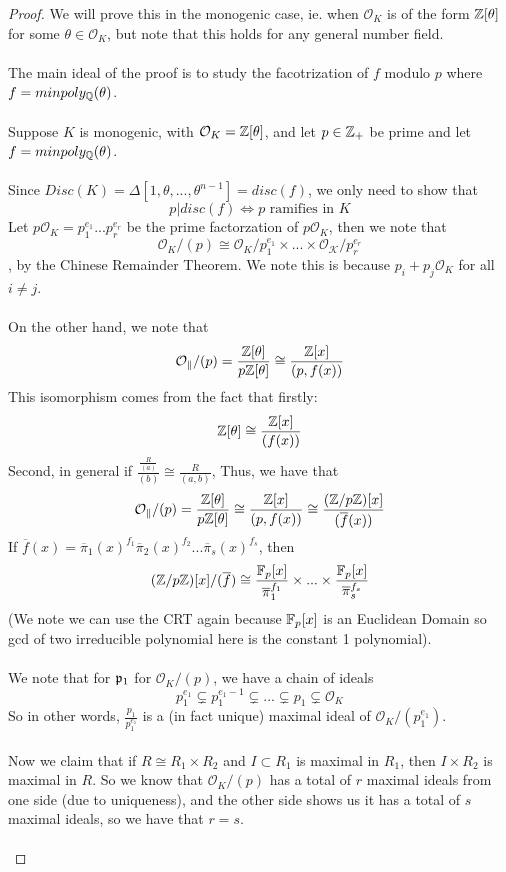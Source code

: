 \begin{proof}
We will prove this in the monogenic case, ie. when $\mathcal{O}_K$ is of the form $\mathbb{Z}[\theta]$ for some $\theta \in \mathcal{O}_K$, but note that this holds for any general number field.\\\\
The main ideal of the proof is to study the facotrization of $f$ modulo $p$ where $f = minpoly_{\mathbb{Q}}(\theta)$.\\\\
Suppose $K$ is monogenic, with $\mathcal{O}_K = \mathbb{Z}[\theta]$, and let $p \in \mathbb{Z}_+$ be prime and let $f = minpoly_{\mathbb{Q}}(\theta)$.\\\\
Since $Disc(K) = \Delta[1, \theta, ..., \theta^{n-1}] = disc(f)$, we only need to show that 
\[p | disc(f) \iff p \text{ ramifies in } K\]
Let $p \mathcal{O}_K = p_1^{e_1}...p_r^{e_r}$ be the prime factorzation of $p \mathcal{O}_K$, then we note that
\[\mathcal{O}_K/(p) \cong \mathcal{O}_K/p_1^{e_1} \times ... \times \mathcal{O_K}/p_r^{e_r}\]
, by the Chinese Remainder Theorem. We note this is because $p_i + p_j \mathcal{O}_K$ for all $i \neq j$.\\\\
On the other hand, we note that
\[\mathcal{O_k}/(p) = \frac{\mathbb{Z}[\theta]}{p\mathbb{Z}[\theta]} \cong \frac{\mathbb{Z}[x]}{(p, f(x))}\]
This isomorphism comes from the fact that firstly:
\[\mathbb{Z}[\theta] \cong \frac{\mathbb{Z}[x]}{(f(x))}\]
Second, in general if $\frac{\frac{R}{(a)}}{(b)} \cong \frac{R}{(a, b)}$, 
Thus, we have that
\[\mathcal{O_k}/(p) = \frac{\mathbb{Z}[\theta]}{p\mathbb{Z}[\theta]} \cong \frac{\mathbb{Z}[x]}{(p, f(x))} \cong \frac{(\mathbb{Z}/p\mathbb{Z})[x]}{(\overline{f}(x))}\]
If $\overline{f}(x) = \overline{\pi}_1(x)^{f_1} \overline{\pi}_2(x)^{f_2} ... \overline{\pi}_s(x)^{f_s}$, then 
\[(\mathbb{Z}/p\mathbb{Z})[x]/(\overline{f}) \cong \frac{\mathbb{F}_p[x]}{\overline{\pi}_1^{f_1}} \times ... \times \frac{\mathbb{F}_p[x]}{\overline{\pi}_s^{f_s}}\]
(We note we can use the CRT again because $\mathbb{F}_p[x]$ is an Euclidean Domain so gcd of two irreducible polynomial here is the constant 1 polynomial).\\\\
We note that for $\mathfrak{p}_1$ for $\mathcal{O}_K/(p)$, we have a chain of ideals
\[p_1^{e_1} \subsetneq p_1^{e_1 - 1} \subsetneq ... \subsetneq p_1 \subsetneq \mathcal{O}_K\]
So in other words, $\frac{p_1}{p_1^{e_1}}$ is a (in fact unique) maximal ideal of $\mathcal{O}_K/(p_1^{e_1})$.\\\\
Now we claim that if $R \cong R_1 \times R_2$ and $I \subset R_1$ is maximal in $R_1$, then $I \times R_2$ is maximal in $R$. So we know that $\mathcal{O}_K/(p)$ has a total of $r$ maximal ideals from one side (due to uniqueness), and the other side shows us it has a total of $s$ maximal ideals, so we have that $r = s$.\\\\

\end{proof}
